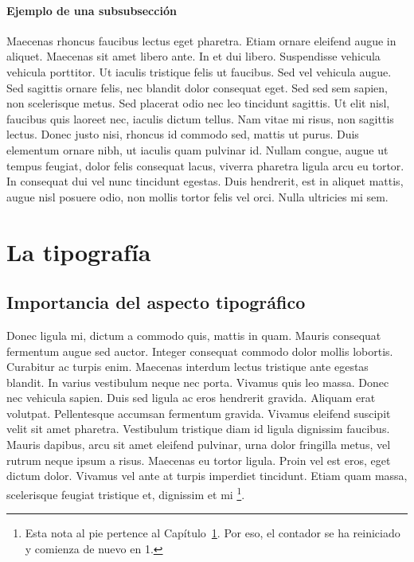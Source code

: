 \documentclass[11pt, a4paper]{report}
\begin{document}
\subsubsection{Ejemplo de una subsubsección}

Maecenas rhoncus faucibus lectus eget pharetra. Etiam ornare eleifend augue in aliquet. Maecenas sit amet libero ante. In et dui libero. Suspendisse vehicula vehicula porttitor. Ut iaculis tristique felis ut faucibus. Sed vel vehicula augue. Sed sagittis ornare felis, nec blandit dolor consequat eget. Sed sed sem sapien, non scelerisque metus. Sed placerat odio nec leo tincidunt sagittis. Ut elit nisl, faucibus quis laoreet nec, iaculis dictum tellus. Nam vitae mi risus, non sagittis lectus. Donec justo nisi, rhoncus id commodo sed, mattis ut purus. Duis elementum ornare nibh, ut iaculis quam pulvinar id. Nullam congue, augue ut tempus feugiat, dolor felis consequat lacus, viverra pharetra ligula arcu eu tortor. In consequat dui vel nunc tincidunt egestas. Duis hendrerit, est in aliquet mattis, augue nisl posuere odio, non mollis tortor felis vel orci. Nulla ultricies mi sem.








\chapter{La tipografía}
\label{cap.tipografia}




\section{Importancia del aspecto tipográfico}


Donec ligula mi, dictum a commodo quis, mattis in quam. Mauris consequat fermentum augue sed auctor. Integer consequat commodo dolor mollis lobortis. Curabitur ac turpis enim. Maecenas interdum lectus tristique ante egestas blandit. In varius vestibulum neque nec porta. Vivamus quis leo massa. Donec nec vehicula sapien. Duis sed ligula ac eros hendrerit gravida. Aliquam erat volutpat. Pellentesque accumsan fermentum gravida. Vivamus eleifend suscipit velit sit amet pharetra. Vestibulum tristique diam id ligula dignissim faucibus. Mauris dapibus, arcu sit amet eleifend pulvinar, urna dolor fringilla metus, vel rutrum neque ipsum a risus. Maecenas eu tortor ligula. Proin vel est eros, eget dictum dolor. Vivamus vel ante at turpis imperdiet tincidunt. Etiam quam massa, scelerisque feugiat tristique et, dignissim et mi%
\footnote{Esta nota al pie pertence al Capítulo~\ref{cap.tipografia}. Por eso, el contador se ha reiniciado y comienza de nuevo en 1.}.
\end{document}
